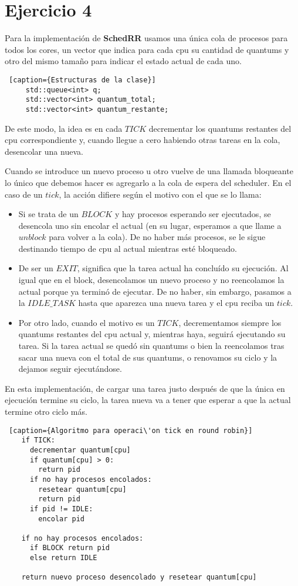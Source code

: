 \section{Ejercicio 4}

Para la implementación de \textbf{SchedRR} usamos una única cola de procesos para todos los cores, un vector que indica para cada cpu su cantidad de quantums y otro del mismo tamaño para indicar el estado actual de cada uno.
  \begin{lstlisting} [caption={Estructuras de la clase}]
     std::queue<int> q;
     std::vector<int> quantum_total;
     std::vector<int> quantum_restante;
  \end{lstlisting}

De este modo, la idea es en cada $TICK$ decrementar los quantums restantes del cpu correspondiente y, cuando llegue a cero habiendo otras tareas en la cola, desencolar una nueva.

Cuando se introduce un nuevo proceso u otro vuelve de una llamada bloqueante lo único que debemos hacer es agregarlo a la cola de espera del scheduler.
En el caso de un $tick$, la acción difiere según el motivo con el que se lo llama:

  \begin{itemize}
    \item Si se trata de un $BLOCK$ y hay procesos esperando ser ejecutados, se desencola uno sin encolar el actual (en su lugar, esperamos a que llame a $unblock$ para volver a la cola). De no haber más procesos, se le sigue destinando tiempo de cpu al actual mientras esté bloqueado.
    \item De ser un $EXIT$, significa que la tarea actual ha concluído su ejecución. Al igual que en el block, desencolamos un nuevo proceso y no reencolamos la actual porque ya terminó de ejecutar. De no haber, sin embargo, pasamos a la $IDLE\_TASK$ hasta que aparezca una nueva tarea y el cpu reciba un $tick$.
    \item Por otro lado, cuando el motivo es un $TICK$, decrementamos siempre los quantums restantes del cpu actual y, mientras haya, seguirá ejecutando su tarea. Si la tarea actual se quedó sin quantums o bien la reencolamos tras sacar una nueva con el total de sus quantums, o renovamos su ciclo y la dejamos seguir ejecutándose.
  \end{itemize}

En esta implementación, de cargar una tarea justo después de que la única en ejecución termine su ciclo, la tarea nueva va a tener que esperar a que la actual termine otro ciclo más.

  \begin{lstlisting} [caption={Algoritmo para operaci\'on tick en round robin}]
    if TICK:
      decrementar quantum[cpu]
      if quantum[cpu] > 0:
        return pid
      if no hay procesos encolados:
        resetear quantum[cpu]
        return pid
      if pid != IDLE:
        encolar pid

    if no hay procesos encolados:
      if BLOCK return pid
      else return IDLE

    return nuevo proceso desencolado y resetear quantum[cpu]
  \end{lstlisting}
